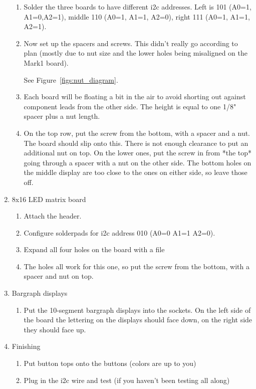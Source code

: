 \documentclass[11pt]{article}
\begin{document}
\begin{enumerate}
\begin{enumerate}
		\item Solder the three boards to have different i2c addresses.
			Left is 101 (A0=1, A1=0,A2=1), 
			middle 110 (A0=1, A1=1, A2=0),
			right 111 (A0=1, A1=1, A2=1).
			

		\item Now set up the spacers and screws.  
			This didn't really go according
			to plan (mostly due to nut size and the lower holes 
			being misaligned on the Mark1 board).
			
			See Figure~\ref{figs:nut_diagram}.


		\item Each board will be floating a bit in the air to avoid
			shorting out
			against component leads from the other side.
			The height is equal to one 1/8" spacer plus a
			nut length.  

		\item On the top row, put the screw from the bottom, with
			a spacer and a nut.
			The board should slip onto this.
			There is not enough clearance to put an additional
			nut on top.
			On the lower ones, put the screw in from *the top*
			going through 
			a spacer with a nut on the other side.
			The bottom holes on the middle display are too close
			to the ones
			on either side, so leave those off.

	\end{enumerate}

\item 8x16 LED matrix board
	\begin{enumerate}

	\item	Attach the header.
	\item   Configure solderpads for i2c address 010
		(A0=0 A1=1 A2=0).
	\item   Expand all four holes on the board with a file
	\item   The holes all work for this one, so put the screw
		from the bottom, with a spacer and nut on top.
	\end{enumerate}


\item Bargraph displays
	\begin{enumerate}

	\item	Put the 10-segment bargraph displays into the sockets.
		On the left side of the board the lettering on the
		displays should
		face down, on the right side they should face up.
	\end{enumerate}

\item Finishing
	\begin{enumerate}

	\item	Put button tops onto the buttons (colors are up to you)

	\item	Plug in the i2c wire and test 
		(if you haven't been testing all along)
	\end{enumerate}


\end{enumerate}
\end{document}
